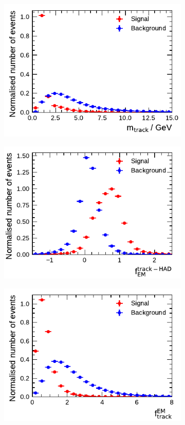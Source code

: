 \begin{figure}[!ht]\ContinuedFloat
  \begin{subfigure}{0.5\textwidth}
    \centering
    \includegraphics{./figures/baseline_bdt_vars/3p/massTrkSys.pdf}
  \end{subfigure}%
  \begin{subfigure}{0.5\textwidth}
    \centering
    \includegraphics{./figures/baseline_bdt_vars/3p/ChPiEMEOverCaloEME.pdf}
  \end{subfigure}
  \begin{subfigure}{0.5\textwidth}
    \centering
    \includegraphics{./figures/baseline_bdt_vars/3p/EMPOverTrkSysP.pdf}

\end{subfigure}
\end{figure}
